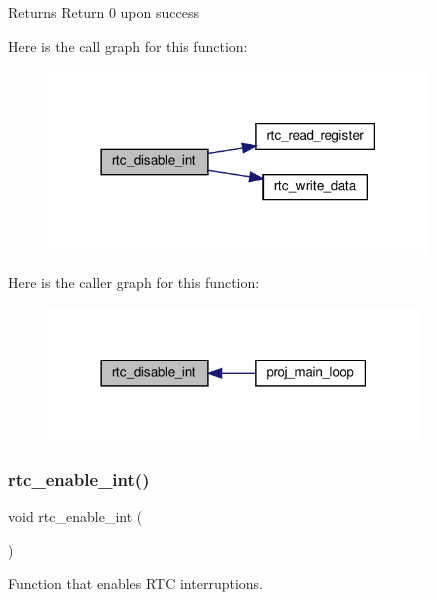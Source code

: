 \begin{DoxyReturn}{Returns}
Return 0 upon success 
\end{DoxyReturn}
Here is the call graph for this function\+:
\nopagebreak
\begin{figure}[H]
\begin{center}
\leavevmode
\includegraphics[width=285pt]{group__rtc_ga0f8758bf0df6766696104c3be6c0c6ea_cgraph}
\end{center}
\end{figure}
Here is the caller graph for this function\+:
\nopagebreak
\begin{figure}[H]
\begin{center}
\leavevmode
\includegraphics[width=278pt]{group__rtc_ga0f8758bf0df6766696104c3be6c0c6ea_icgraph}
\end{center}
\end{figure}
\mbox{\label{group__rtc_ga8d098a183fdb5fc38da0335041c4d3db}} 
\subsubsection{\texorpdfstring{rtc\+\_\+enable\+\_\+int()}{rtc\_enable\_int()}}
{\footnotesize\ttfamily void rtc\+\_\+enable\+\_\+int (\begin{DoxyParamCaption}{ }\end{DoxyParamCaption})}



Function that enables R\+TC interruptions. 


